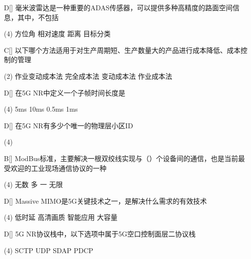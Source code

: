 \begin{choice}{D}[]
    毫米波雷达是一种重要的ADAS传感器，可以提供多种高精度的路面空间信息，其中，不包括
    \begin{tasks}(4)
        \task 方位角
        \task 相对速度
        \task 距离
        \task 目标分类
    \end{tasks}
\end{choice}


\begin{choice}{C}[]
    以下哪个方法适用于对生产周期短、生产数量大的产品进行成本降低、成本控制的管理
    \begin{tasks}(2)
        \task 作业变动成本法
        \task 完全成本法
        \task 变动成本法
        \task 作业成本法
    \end{tasks}
\end{choice}



\begin{choice}{D}[]
    在5G NR中定义一个子帧时间长度是
    \begin{tasks}(4)
        \task 5ms
        \task 10ms
        \task 0.5ms
        \task 1ms
    \end{tasks}
\end{choice}


\begin{choice}{D}[]
    在5G NR有多少个唯一的物理层小区ID
    \begin{tasks}(4)
    \end{tasks}
\end{choice}


\begin{choice}{B}[]
    ModBus标准，主要解决一根双绞线实现与（\quad）个设备间的通信，也是当前最受欢迎的工业现场通信协议的一种
    \begin{tasks}(4)
        \task 无数
        \task 多
        \task 一
        \task 无限
    \end{tasks}
\end{choice}


\begin{choice}{D}[]
    Massive MIMO是5G关键技术之一，是解决什么需求的有效技术
    \begin{tasks}(4)
        \task 低时延
        \task 高清画质
        \task 智能应用
        \task 大容量
    \end{tasks}
\end{choice}


\begin{choice}{D}[]
    5G NR协议栈中，以下选项中属于5G空口控制面层二协议栈
    \begin{tasks}(4)
        \task SCTP
        \task UDP
        \task SDAP
        \task PDCP
    \end{tasks}
\end{choice}



